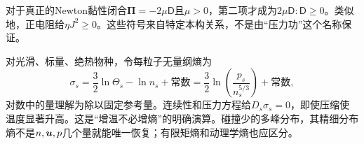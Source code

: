 对于真正的Newton黏性闭合$\boldsymbol{\Pi}=-2\mu\mathsf D$且$\mu>0$，第二项才成为$2\mu\mathsf D:\mathsf D\geq0$。类似地，正电阻给$\eta J^2\geq0$。这些符号来自特定本构关系，不是由“压力功”这个名称保证。

对光滑、标量、绝热物种，令每粒子无量纲熵为
\begin{equation}
\sigma_s=\frac32\ln\Theta_s-\ln n_s+\text{常数}
=\frac32\ln\left(\frac{p_s}{n_s^{5/3}}\right)+\text{常数},
\end{equation}
对数中的量理解为除以固定参考量。连续性和压力方程给$D_s\sigma_s=0$，即使压缩使温度显著升高。这是“增温不必增熵”的明确演算。碰撞少的多峰分布，其精细分布熵不是$n,\bm{u},p$几个量就能唯一恢复；有限矩熵和动理学熵也应区分。

